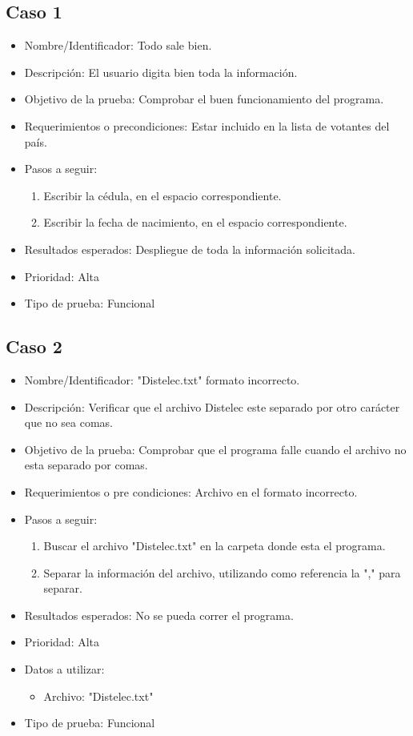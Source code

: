 \documentclass[conference]{IEEEtran}
\begin{document}
\subsection{Caso 1}
\begin{itemize}
\item Nombre/Identificador: Todo sale bien.
\item Descripción: El usuario digita bien toda la información.
\item Objetivo de la prueba: Comprobar el buen funcionamiento del programa.
\item Requerimientos o precondiciones: Estar incluido en la lista de votantes del país.
\item Pasos a seguir: 
\begin{enumerate}
\item Escribir la cédula, en el espacio correspondiente.
\item Escribir la fecha de nacimiento, en el espacio correspondiente.
\end{enumerate}
\item Resultados esperados: Despliegue de toda la información solicitada.
\item Prioridad: Alta
\item Tipo de prueba: Funcional
\end{itemize}

\subsection{Caso 2}
\begin{itemize}
\item Nombre/Identificador: "Distelec.txt" formato incorrecto.
\item Descripción: Verificar que el archivo Distelec este separado por otro carácter que no sea comas.
\item Objetivo de la prueba: Comprobar que el programa falle cuando el archivo no esta separado por comas. 
\item Requerimientos o pre condiciones: Archivo en el formato incorrecto.
\item Pasos a seguir: 
\begin{enumerate}
\item Buscar el archivo "Distelec.txt" en la carpeta donde esta el programa.
\item Separar la información del archivo, utilizando como referencia la "," para separar.
\end{enumerate}
\item Resultados esperados: No se pueda correr el programa.
\item Prioridad: Alta
\item Datos a utilizar: 
\begin{itemize}
\item Archivo: "Distelec.txt"
\end{itemize}
\item Tipo de prueba: Funcional
\end{itemize}
\end{document}
